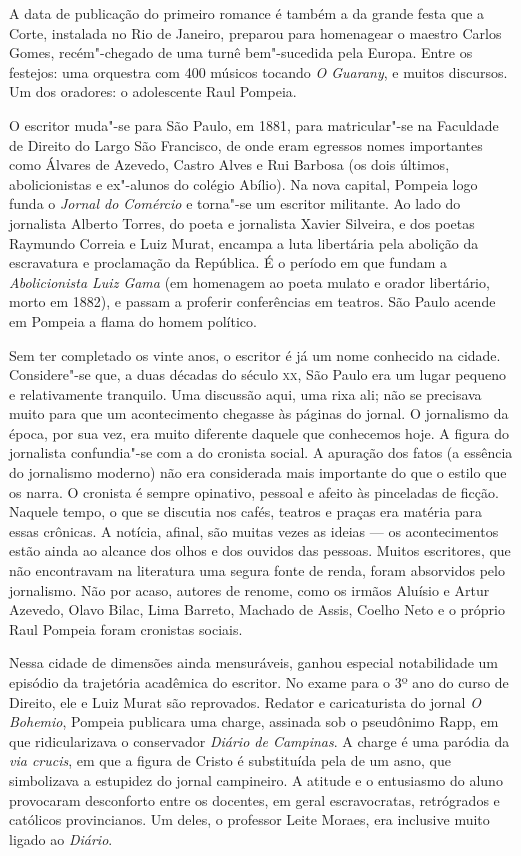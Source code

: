 A data de publicação do primeiro romance é também a da
grande festa que a Corte, instalada no Rio de Janeiro, preparou para
homenagear o maestro Carlos Gomes, recém"-chegado de uma turnê
bem"-sucedida pela Europa. Entre os festejos: uma orquestra com 400
músicos tocando \textit{O Guarany}, e muitos
discursos. Um dos oradores: o adolescente Raul Pompeia.

O escritor muda"-se para São Paulo, em 1881, para
matricular"-se na Faculdade de Direito do Largo São Francisco, de onde
eram egressos nomes importantes como Álvares de Azevedo, Castro Alves e
Rui Barbosa (os dois últimos, abolicionistas e ex"-alunos do colégio
Abílio). Na nova capital, Pompeia logo funda o \textit{Jornal
 do Comércio} e torna"-se um escritor militante. Ao
lado do jornalista Alberto Torres, do poeta e jornalista Xavier
Silveira, e dos poetas Raymundo Correia e Luiz Murat, encampa a luta
libertária pela abolição da escravatura e proclamação da República. É o
período em que fundam a \textit{Abolicionista Luiz
Gama} (em homenagem ao poeta mulato e orador
libertário, morto em 1882), e passam a proferir conferências em
teatros. São Paulo acende em Pompeia a flama do homem político.

Sem ter completado os vinte anos, o escritor é já um nome conhecido na
cidade. Considere"-se que, a duas décadas do século \textsc{xx}, São Paulo era
um lugar pequeno e relativamente tranquilo. Uma discussão aqui, uma
rixa ali; não se precisava muito para que um acontecimento chegasse às
páginas do jornal. O jornalismo da época, por sua vez, era muito
diferente daquele que conhecemos hoje. A figura do jornalista
confundia"-se com a do cronista social. A apuração dos fatos (a
essência do jornalismo moderno) não era considerada mais importante do
que o estilo que os narra. O cronista é sempre opinativo, pessoal e
afeito às pinceladas de ficção. Naquele tempo, o que se discutia nos
cafés, teatros e praças era matéria para essas crônicas. A notícia,
afinal, são muitas vezes as ideias --- os acontecimentos estão ainda ao
alcance dos olhos e dos ouvidos das pessoas. Muitos escritores, que não
encontravam na literatura uma segura fonte de renda, foram absorvidos
pelo jornalismo. Não por acaso, autores de renome, como os irmãos
Aluísio e Artur Azevedo, Olavo Bilac, Lima Barreto, Machado de Assis,
Coelho Neto e o próprio Raul Pompeia foram cronistas sociais.


Nessa cidade de dimensões ainda mensuráveis, ganhou
especial notabilidade um episódio da trajetória acadêmica do escritor.
No exame para o 3º ano do curso
de Direito, ele e Luiz Murat são reprovados. Redator e caricaturista do
jornal \textit{O Bohemio}, Pompeia publicara
uma charge, assinada sob o pseudônimo Rapp, em que ridicularizava o
conservador \textit{Diário de Campinas}. A
charge é uma paródia da \textit{via crucis},
em que a figura de Cristo é substituída pela de um asno, que
simbolizava a estupidez do jornal campineiro. A atitude e o entusiasmo
do aluno provocaram desconforto entre os docentes, em geral
escravocratas, retrógrados e católicos provincianos. Um deles, o
professor Leite Moraes, era inclusive muito ligado ao
\textit{Diário}.


